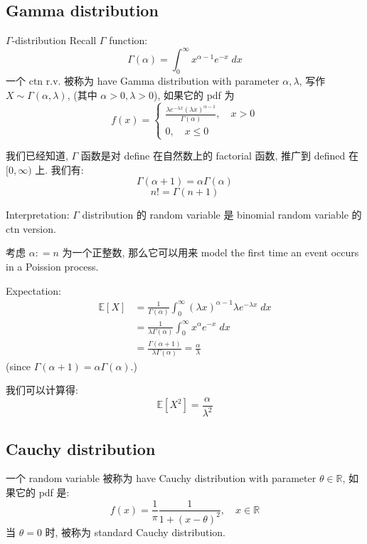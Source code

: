 \subsection{Gamma distribution}

\begin{definition}{$\Gamma$-distribution}
Recall $\Gamma$ function: \[
    \Gamma(\alpha) = \int_0^\infty x^{\alpha - 1} e^{-x}\; dx
    \]
一个 ctn r.v. 被称为 have Gamma distribution with parameter $\alpha, \lambda$, 写作 $X \sim \Gamma(\alpha, \lambda)$, (其中 $\alpha > 0, \lambda > 0$), 如果它的 pdf 为 \[
f(x) = \begin{cases}
    \frac{\lambda e^{-\lambda x} (\lambda x)^{\alpha -1} }{\Gamma (\alpha)}, \quad x>0 \\
    0, \quad x \leq 0
\end{cases}
\]
\end{definition}
\begin{remark}
我们已经知道, $\Gamma$ 函数是对 define 在自然数上的 factorial 函数, 推广到 defined 在 $[0,\infty)$ 上.
我们有:  \[
\Gamma(\alpha + 1) = \alpha \Gamma(\alpha)
\]\[
n! = \Gamma(n+1)
\]
\end{remark}


Interpretation: $\Gamma$ distribution 的 random variable 是 binomial random variable 的 ctn version.

考虑 $\alpha : = n$ 为一个正整数, 那么它可以用来 model the first time an event occurs in a Poission process.

Expectation:  \begin{align}
    \mathbb{E}[X] &= \frac{1}{\Gamma(\alpha)} \int_0^\infty (\lambda x )^{\alpha -1} \lambda  e^{-\lambda x} \; dx\\
    &=  \frac{1}{\lambda \Gamma(\alpha)}  \int_0^\infty x^\alpha e^{-x} \; dx \\
    &= \frac{\Gamma(\alpha + 1)}{\lambda \Gamma(\alpha)} = \frac{\alpha}{\lambda}
\end{align}
(since $\Gamma(\alpha + 1) = \alpha \Gamma(\alpha)$.)

我们可以计算得: \[
\mathbb{E}[X^2] = \frac{\alpha}{\lambda^2}
\]

\subsection{Cauchy distribution}
\begin{definition}
    一个 random variable 被称为 have Cauchy distribution with parameter $\theta \in \mathbb{R}$, 如果它的 pdf 是: \[
    f(x)   =\frac{1}{\pi} \frac{1}{1+(x-\theta)^2} , \quad x\in \mathbb{R}
    \]
    当 $\theta = 0$ 时, 被称为 standard Cauchy distribution.
\end{definition}


